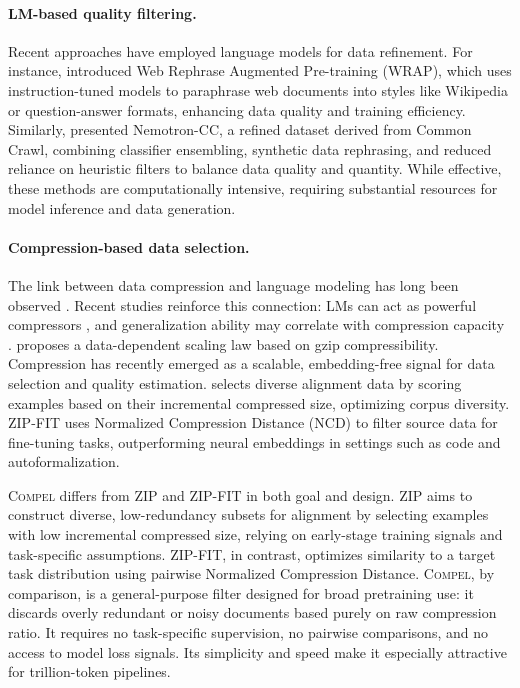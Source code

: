 \paragraph{LM-based quality filtering.}
Recent approaches have employed language models for data refinement.
For instance, \citet{maini2024rephrasing} introduced Web Rephrase Augmented Pre-training (WRAP), which uses instruction-tuned models to paraphrase web documents into styles like Wikipedia or question-answer formats, enhancing data quality and training efficiency.
Similarly, \citet{su2024nemotron} presented Nemotron-CC, a refined dataset derived from Common Crawl, combining classifier ensembling, synthetic data rephrasing, and reduced reliance on heuristic filters to balance data quality and quantity.
While effective, these methods are computationally intensive, requiring substantial resources for model inference and data generation.

\paragraph{Compression-based data selection.}
The link between data compression and language modeling has long been observed \citep{shannon1951prediction}.
Recent studies reinforce this connection: LMs can act as powerful compressors \citep{deletang2023language}, and generalization ability may correlate with compression capacity \citep{huang2024compression}.
\citet{pandey2024gzip} proposes a data-dependent scaling law based on gzip compressibility.
Compression has recently emerged as a scalable, embedding-free signal for data selection and quality estimation.
\citet{yin2024entropy} selects diverse alignment data by scoring examples based on their incremental compressed size, optimizing corpus diversity.
ZIP-FIT \citep{obbad2024zipfit} uses Normalized Compression Distance (NCD) to filter source data for fine-tuning tasks, outperforming neural embeddings in settings such as code and autoformalization.

\textsc{Compel} differs from ZIP and ZIP-FIT in both goal and design.
ZIP aims to construct diverse, low-redundancy subsets for alignment by selecting examples with low incremental compressed size, relying on early-stage training signals and task-specific assumptions.
ZIP-FIT, in contrast, optimizes similarity to a target task distribution using pairwise Normalized Compression Distance.
\textsc{Compel}, by comparison, is a general-purpose filter designed for broad pretraining use: it discards overly redundant or noisy documents based purely on raw compression ratio.
It requires no task-specific supervision, no pairwise comparisons, and no access to model loss signals.
Its simplicity and speed make it especially attractive for trillion-token pipelines.
